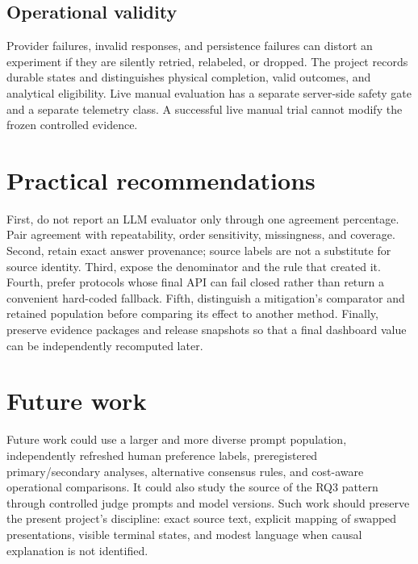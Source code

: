 \subsection{Operational validity}
Provider failures, invalid responses, and persistence failures can distort an experiment if they are silently retried, relabeled, or dropped. The project records durable states and distinguishes physical completion, valid outcomes, and analytical eligibility. Live manual evaluation has a separate server-side safety gate and a separate telemetry class. A successful live manual trial cannot modify the frozen controlled evidence.

\section{Practical recommendations}

First, do not report an LLM evaluator only through one agreement percentage. Pair agreement with repeatability, order sensitivity, missingness, and coverage. Second, retain exact answer provenance; source labels are not a substitute for source identity. Third, expose the denominator and the rule that created it. Fourth, prefer protocols whose final API can fail closed rather than return a convenient hard-coded fallback. Fifth, distinguish a mitigation's comparator and retained population before comparing its effect to another method. Finally, preserve evidence packages and release snapshots so that a final dashboard value can be independently recomputed later.

\section{Future work}

Future work could use a larger and more diverse prompt population, independently refreshed human preference labels, preregistered primary/secondary analyses, alternative consensus rules, and cost-aware operational comparisons. It could also study the source of the RQ3 pattern through controlled judge prompts and model versions. Such work should preserve the present project's discipline: exact source text, explicit mapping of swapped presentations, visible terminal states, and modest language when causal explanation is not identified.
